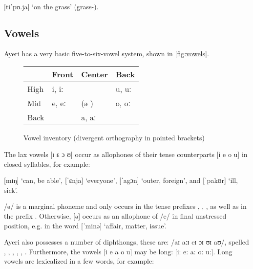 \ex
	 [tiˈpʊ.ja] `on the grass' (grass-\Loc{}).
\xe

\subsection{Vowels}

Ayeri has a very basic five-to-six-vowel system, shown in \autoref{fig:vowels}.

\begin{figure}[ht]\centering
\caption[Vowel inventory]{Vowel inventory (divergent orthography in pointed brackets)}
\begin{tabu} to .5\textwidth{H[1] X[2c] X[2c] X[2c]}
\toprule\tableheaderfont

	& Front
	& Center
	& Back
	\\

\toprule

High
	& i, iː 
	&
	& u, uː 
	\\

Mid
	& e, eː 
	& (ə )
	& o, oː 
	\\

Back
	&
	& a, aː 
	&
	\\

\bottomrule
\end{tabu}
\label{fig:vowels}
\end{figure}

The lax vowels [ɪ ɛ ɔ ʊ] occur as allophones of their tense counterparts 
[i e o u] in closed syllables, for example:

\pex
	\a {} [mɪŋ] `can, be able',
	\a {} [ˈɛnja] `everyone',
	\a {} [ˈagɔn] `outer, foreign', and
	\a {} [ˈpakʊr] `ill, sick'.
\xe

/ə/ is a marginal phoneme and only occurs in the tense prefixes 
, , , as 
well as in the prefix . Otherwise, [ə] occurs 
as an allophone of /e/ in final unstressed position, e.g. in the word 
 [ˈminə] `affair, matter, issue'.

Ayeri also possesses a number of diphthongs, these are: /aɪ aːɪ eɪ ɔɪ ʊɪ aʊ/, 
spelled , , , , , .
Furthermore, the vowels [i e a o u] may be long: [iː eː aː oː uː]. Long vowels 
are lexicalized in a few words, for example:

